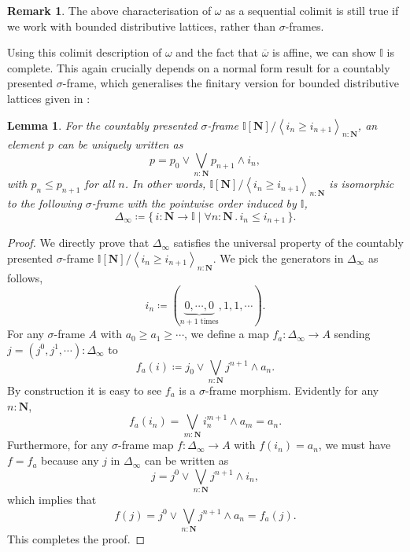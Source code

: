 \documentclass[a4paper,12pt]{amsart}
\newtheorem{lemma}[theorem]{Lemma}
\theoremstyle{definition}
\newtheorem{remark}[theorem]{Remark}
\newcommand{\mb}[1]{\mathbf{#1}}
\newcommand{\mbb}[1]{\mathbb{#1}}
\newcommand{\I}{\mbb I}
\newcommand{\ov}[1]{\overline{#1}}
\newcommand{\pair}[1]{\left\langle#1\right\rangle}
\newcommand{\scomp}[2]{\{\,#1\mid#2\,\}}
\newcommand{\N}{\mb N}
\newcommand{\fa}[2]{\forall #1\!\colon\!\!#2\mathpunct{.}}
\begin{document}
\begin{remark}\label{rem:omegaalwayscolim}
  The above characterisation of $\omega$ as a sequential colimit is still true if we work with bounded distributive lattices, rather than $\sigma$-frames.
\end{remark}

Using this colimit description of $\omega$ and the fact that $\ov\omega$ is affine, we can show $\I$ is complete. This again crucially depends on a normal form result for a countably presented $\sigma$-frame, which generalises the finitary version for bounded distributive lattices given in :

\begin{lemma}\label{app:normalsigma}
  For the countably presented $\sigma$-frame $\I[\N]/\pair{i_n \ge i_{n+1}}_{n:\N}$, an element $p$ can be uniquely written as 
  \[ p = p_0 \vee \bigvee_{n:\N} p_{n+1} \wedge i_n, \]
  with $p_n \le p_{n+1}$ for all $n$. In other words, $\I[\N]/\pair{i_n \ge i_{n+1}}_{n:\N}$ is isomorphic to the following $\sigma$-frame with the pointwise order induced by $\I$,
  \[ \Delta_\infty \coloneq \scomp{i : \N \to \I}{\fa n\N i_n \le i_{n+1}}. \]
\end{lemma}
\begin{proof}
  We directly prove that $\Delta_\infty$ satisfies the universal property of the countably presented $\sigma$-frame $\I[\N]/\pair{i_n \ge i_{n+1}}_{n:\N}$. We pick the generators in $\Delta_\infty$ as follows,
  \[ i_n \coloneq (\underbrace{0,\cdots,0}_{n+1 \text{ times}},1,1,\cdots). \]
  For any $\sigma$-frame $A$ with $a_0 \ge a_1 \ge \cdots$, we define a map $f_a : \Delta_\infty \to A$ sending $j = (j^0,j^1,\cdots) : \Delta_\infty$ to
  \[ f_a(i) \coloneq j_0 \vee \bigvee_{n:\N} j^{n+1} \wedge a_{n}. \]
  By construction it is easy to see $f_a$ is a $\sigma$-frame morphism. Evidently for any $n : \N$, 
  \[ f_a(i_n) = \bigvee_{m:\N} i_n^{m+1} \wedge a_m = a_n. \]
  Furthermore, for any $\sigma$-frame map $f \colon \Delta_\infty \to A$ with $f(i_n) = a_n$, we must have $f = f_a$ because any $j$ in $\Delta_\infty$ can be written as
  \[ j = j^0 \vee \bigvee_{n:\N} j^{n+1} \wedge i_n, \]
  which implies that
  \[ f(j) = j^0 \vee \bigvee_{n:\N}j^{n+1} \wedge a_n = f_a(j). \]
  This completes the proof.
\end{proof}

\end{document}
